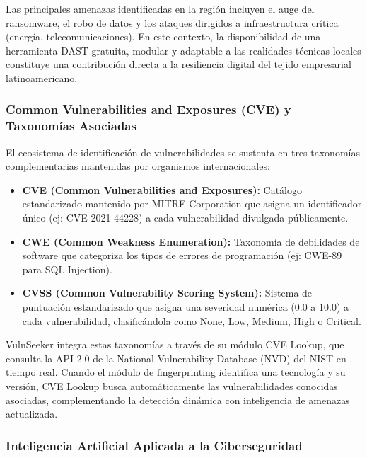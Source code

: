 \documentclass[12pt, a4paper]{article}
\begin{document}
Las principales amenazas identificadas en la región incluyen el auge del
ransomware, el robo de datos y los ataques dirigidos a infraestructura
crítica (energía, telecomunicaciones). En este contexto, la disponibilidad
de una herramienta DAST gratuita, modular y adaptable a las realidades
técnicas locales constituye una contribución directa a la resiliencia
digital del tejido empresarial latinoamericano.

\subsubsection{Common Vulnerabilities and Exposures (CVE) y Taxonomías Asociadas}

El ecosistema de identificación de vulnerabilidades se sustenta en tres
taxonomías complementarias mantenidas por organismos internacionales:

\begin{itemize}
    \item \textbf{CVE (Common Vulnerabilities and Exposures):} Catálogo
    estandarizado mantenido por MITRE Corporation que asigna un identificador
    único (ej: CVE-2021-44228) a cada vulnerabilidad divulgada públicamente.

    \item \textbf{CWE (Common Weakness Enumeration):} Taxonomía de debilidades
    de software que categoriza los tipos de errores de programación (ej:
    CWE-89 para SQL Injection).

    \item \textbf{CVSS (Common Vulnerability Scoring System):} Sistema de
    puntuación estandarizado que asigna una severidad numérica (0.0 a 10.0) a
    cada vulnerabilidad, clasificándola como None, Low, Medium, High o Critical.
\end{itemize}

VulnSeeker integra estas taxonomías a través de su módulo CVE Lookup, que
consulta la API 2.0 de la National Vulnerability Database (NVD) del NIST en
tiempo real. Cuando el módulo de fingerprinting identifica una tecnología y su
versión, CVE Lookup busca automáticamente las vulnerabilidades conocidas
asociadas, complementando la detección dinámica con inteligencia de amenazas
actualizada.

\subsubsection{Inteligencia Artificial Aplicada a la Ciberseguridad}
\end{document}
